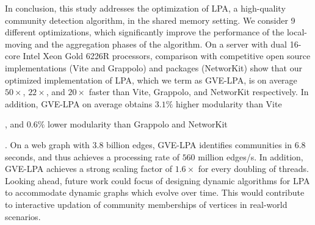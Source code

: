 In conclusion, this study addresses the optimization of LPA, a high-quality community detection algorithm, in the shared memory setting. We consider 9 different optimizations, which significantly improve the performance of the local-moving and the aggregation phases of the algorithm. On a server with dual 16-core Intel Xeon Gold 6226R processors, comparison with competitive open source implementations (Vite and Grappolo) and packages (NetworKit) show that our optimized implementation of LPA, which we term as GVE-LPA, is on average $50\times$, $22\times$, and $20\times$ faster than Vite, Grappolo, and NetworKit respectively. In addition, GVE-LPA on average obtains $3.1\%$ higher modularity than Vite, and $0.6\%$ lower modularity than Grappolo and NetworKit. On a web graph with $3.8$ billion edges, GVE-LPA identifies communities in $6.8$ seconds, and thus achieves a processing rate of $560$ million edges/s. In addition, GVE-LPA achieves a strong scaling factor of $1.6\times$ for every doubling of threads. Looking ahead, future work could focus of designing dynamic algorithms for LPA to accommodate dynamic graphs which evolve over time. This would contribute to interactive updation of community memberships of vertices in real-world scenarios.
